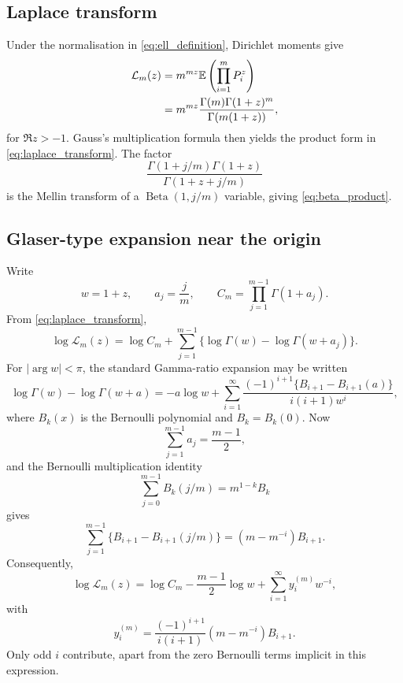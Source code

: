 \documentclass[11pt]{article}
\theoremstyle{remark}
\newcommand{\E}{\mathbb E}
\newcommand{\Bet}{\operatorname{Beta}}
\begin{document}
\subsection{Laplace transform}

Under the normalisation in \eqref{eq:ell_definition}, Dirichlet moments give
\begin{align}
 \mathcal L_m(z)
 &=m^{mz}\E\left(\prod_{i=1}^mP_i^z\right) \notag\\
 &=m^{mz}\frac{\Gamma(m)\Gamma(1+z)^m}{\Gamma(m(1+z))},
 \label{eq:app_laplace1}
\end{align}
for $\Re z>-1$. Gauss's multiplication formula then yields the product form in \eqref{eq:laplace_transform}. The factor
\[
 \frac{\Gamma(1+j/m)\Gamma(1+z)}{\Gamma(1+z+j/m)}
\]
is the Mellin transform of a $\Bet(1,j/m)$ variable, giving \eqref{eq:beta_product}.

\subsection{Glaser-type expansion near the origin}

Write
\[
 w=1+z,\qquad a_j=\frac jm,\qquad
 C_m=\prod_{j=1}^{m-1}\Gamma(1+a_j).
\]
From \eqref{eq:laplace_transform},
\begin{equation}
 \log\mathcal L_m(z)
 =\log C_m+\sum_{j=1}^{m-1}
 \{\log\Gamma(w)-\log\Gamma(w+a_j)\}.
 \label{eq:logL_sum}
\end{equation}
For $|\arg w|<\pi$, the standard Gamma-ratio expansion may be written
\begin{equation}
 \log\Gamma(w)-\log\Gamma(w+a)
 =-a\log w+
 \sum_{i=1}^{\infty}
 \frac{(-1)^{i+1}\{B_{i+1}-B_{i+1}(a)\}}
      {i(i+1)w^i},
 \label{eq:gamma_ratio_bern}
\end{equation}
where $B_k(x)$ is the Bernoulli polynomial and $B_k=B_k(0)$. Now
\[
 \sum_{j=1}^{m-1}a_j=\frac{m-1}{2},
\]
and the Bernoulli multiplication identity
\begin{equation}
 \sum_{j=0}^{m-1}B_k(j/m)=m^{1-k}B_k
 \label{eq:bernoulli_multiplication}
\end{equation}
gives
\begin{equation}
 \sum_{j=1}^{m-1}\{B_{i+1}-B_{i+1}(j/m)\}
 =(m-m^{-i})B_{i+1}.
 \label{eq:bernoulli_sum}
\end{equation}
Consequently,
\begin{equation}
 \log\mathcal L_m(z)
 =\log C_m-\frac{m-1}{2}\log w+
 \sum_{i=1}^{\infty}y_i^{(m)}w^{-i},
 \label{eq:logL_expansion}
\end{equation}
with
\begin{equation}
 y_i^{(m)}=
 \frac{(-1)^{i+1}}{i(i+1)}(m-m^{-i})B_{i+1}.
 \label{eq:y_coeff}
\end{equation}
Only odd $i$ contribute, apart from the zero Bernoulli terms implicit in this expression.
\end{document}
